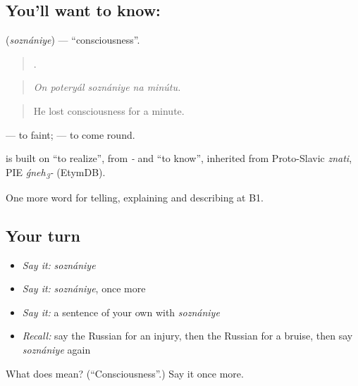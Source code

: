 \subsection*{You'll want to know: }
\textbf{} (\emph{soznániye}) — \textquotedblleft{}consciousness\textquotedblright{}.

\begin{quote}
    .
\end{quote}

\begin{quote}
\emph{On poteryál soznániye na minútu.}
\end{quote}

\begin{quote}
He lost consciousness for a minute.
\end{quote}

\emph{ } — to faint; \emph{  } — to come round.

\begin{cousinweb}
\emph{} is built on \emph{} \textquotedblleft{}to realize\textquotedblright{}, from \emph{-} and \emph{} \textquotedblleft{}to know\textquotedblright{}, inherited from Proto-Slavic \emph{znati}, PIE \emph{ǵneh\textsubscript{3}-} (EtymDB).
\end{cousinweb}

\begin{grammarlens}[title={What you've built}]
One more word for telling, explaining and describing at B1.
\end{grammarlens}

\subsection*{Your turn}
\begin{itemize}
\raggedright
  \item \emph{Say it:} \emph{soznániye}
  \item \emph{Say it:} \emph{soznániye}, once more
  \item \emph{Say it:} a sentence of your own with \emph{soznániye}
  \item \emph{Recall:} say the Russian for an injury, then the Russian for a bruise, then say \emph{soznániye} again
\end{itemize}

\begin{tcolorbox}[breakable,colback=teal!4,colframe=teal!35!black,title={Before you move on}]
What does  mean? (\textquotedblleft{}Consciousness\textquotedblright{}.) Say it once more.
\end{tcolorbox}
